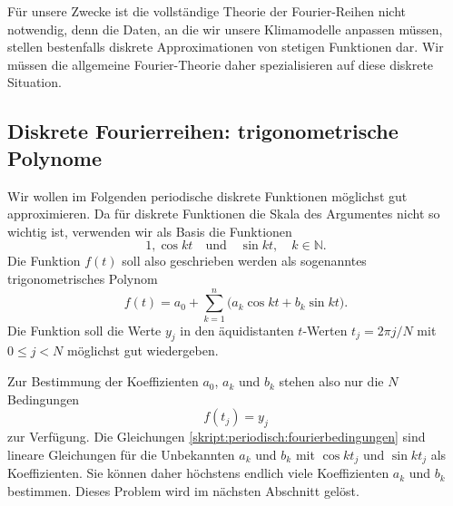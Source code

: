 Für unsere Zwecke ist die vollständige Theorie der Fourier-Reihen nicht
notwendig, denn die Daten, an die wir unsere Klimamodelle anpassen
müssen, stellen bestenfalls diskrete Approximationen von stetigen
Funktionen dar.
Wir müssen die allgemeine Fourier-Theorie daher spezialisieren auf diese
diskrete Situation.

\subsection{Diskrete Fourierreihen: trigonometrische Polynome}
Wir wollen im Folgenden periodische diskrete Funktionen möglichst gut
approximieren.
Da für diskrete Funktionen die Skala des Argumentes nicht so wichtig ist,
verwenden wir als Basis die Funktionen 
\begin{equation}
1,\cos kt\quad\text{und}\quad \sin kt,\quad k\in\mathbb N.
\end{equation}
Die Funktion $f(t)$ soll also geschrieben werden als sogenanntes 
trigonometrisches Polynom
\begin{equation}
f(t)
=
a_0 + \sum_{k=1}^n \bigl(a_k \cos kt + b_k\sin kt).
\end{equation}
Die Funktion soll die Werte $y_j$ in den äquidistanten $t$-Werten 
$t_j=2\pi j/N$ mit $0\le j<N$ möglichst gut wiedergeben.

Zur Bestimmung der Koeffizienten $a_0$, $a_k$ und $b_k$ stehen also nur
die $N$ Bedingungen
\begin{equation}
f(t_j)=y_j
\label{skript:periodisch:fourierbedingungen}
\end{equation}
zur Verfügung.
Die Gleichungen \eqref{skript:periodisch:fourierbedingungen} sind
lineare Gleichungen für die Unbekannten $a_k$ und $b_k$ mit
$\cos kt_j$ und $\sin kt_j$ als Koeffizienten.
Sie können daher höchstens endlich viele Koeffizienten $a_k$ und $b_k$
bestimmen.
Dieses Problem wird im nächsten Abschnitt gelöst.




